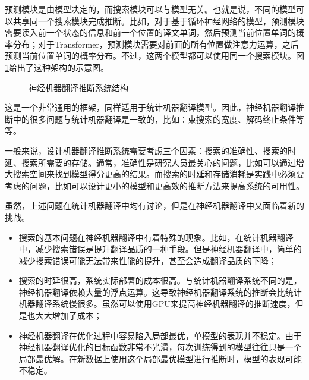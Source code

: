 \parinterval 预测模块是由模型决定的，而搜索模块可以与模型无关。也就是说，不同的模型可以共享同一个搜索模块完成推断。比如，对于基于循环神经网络的模型，预测模块需要读入前一个状态的信息和前一个位置的译文单词，然后预测当前位置单词的概率分布；对于Transformer，预测模块需要对前面的所有位置做注意力运算，之后预测当前位置单词的概率分布。不过，这两个模型都可以使用同一个搜索模块。图\ref{fig:14-1}给出了这种架构的示意图。

\begin{figure}[htp]
\centering

\caption{神经机器翻译推断系统结构}
\label{fig:14-1}
\end{figure}

\parinterval 这是一个非常通用的框架，同样适用于统计机器翻译模型。因此，神经机器翻译推断中的很多问题与统计机器翻译是一致的，比如：束搜索的宽度、解码终止条件等等。

\parinterval 一般来说，设计机器翻译推断系统需要考虑三个因素：搜索的准确性、搜索的时延、搜索所需要的存储。通常，准确性是研究人员最关心的问题，比如可以通过增大搜索空间来找到模型得分更高的结果。而搜索的时延和存储消耗是实践中必须要考虑的问题，比如可以设计更小的模型和更高效的推断方法来提高系统的可用性。

\parinterval 虽然，上述问题在统计机器翻译中均有讨论，但是在神经机器翻译中又面临着新的挑战。

\begin{itemize}
\vspace{0.5em}
\item 搜索的基本问题在神经机器翻译中有着特殊的现象。比如，在统计机器翻译中，减少搜索错误是提升翻译品质的一种手段。但是神经机器翻译中，简单的减少搜索错误可能无法带来性能的提升，甚至会造成翻译品质的下降；
\vspace{0.5em}
\item 搜索的时延很高，系统实际部署的成本很高。与统计机器翻译系统不同的是，神经机器翻译依赖大量的浮点运算。这导致神经机器翻译系统的推断会比统计机器翻译系统慢很多。虽然可以使用GPU来提高神经机器翻译的推断速度，但是也大大增加了成本；
\vspace{0.5em}
\item 神经机器翻译在优化过程中容易陷入局部最优，单模型的表现并不稳定。由于神经机器翻译优化的目标函数非常不光滑，每次训练得到的模型往往只是一个局部最优解。在新数据上使用这个局部最优模型进行推断时，模型的表现可能不稳定。
\vspace{0.5em}
\end{itemize}


